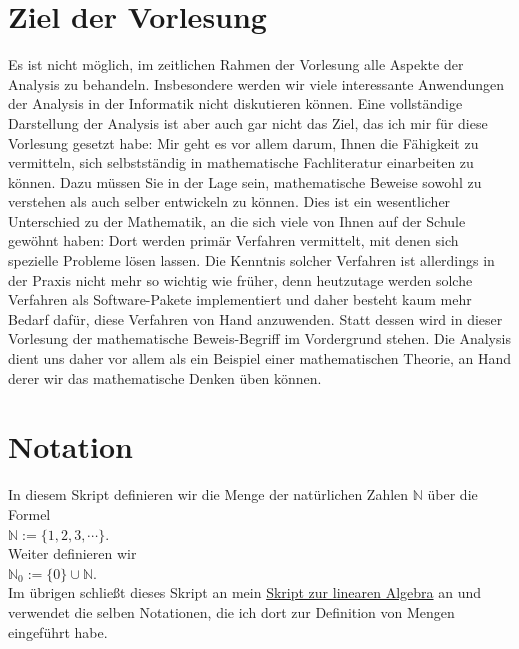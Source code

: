 \section{Ziel der Vorlesung}
Es ist nicht m\"oglich, im zeitlichen Rahmen der Vorlesung alle Aspekte der Analysis zu behandeln.
Insbesondere werden wir viele interessante Anwendungen der Analysis in der Informatik nicht
diskutieren k\"onnen.  Eine vollst\"andige Darstellung der Analysis ist aber auch gar nicht das Ziel,
das ich mir f\"ur diese Vorlesung gesetzt habe:  Mir geht es vor allem  darum, Ihnen die F\"ahigkeit zu
vermitteln, sich selbstst\"andig in mathematische Fachliteratur einarbeiten zu k\"onnen.  Dazu m\"ussen
Sie in der Lage 
sein, mathematische Beweise sowohl zu verstehen als auch selber entwickeln zu k\"onnen.   Dies ist ein
wesentlicher Unterschied zu der Mathematik, an die sich viele von Ihnen auf der Schule gew\"ohnt haben:
Dort werden prim\"ar Verfahren vermittelt, mit denen sich spezielle Probleme l\"osen lassen.  Die Kenntnis
solcher Verfahren ist allerdings in der Praxis nicht mehr so wichtig wie fr\"uher, denn heutzutage
werden solche Verfahren als Software-Pakete implementiert und daher besteht kaum mehr Bedarf daf\"ur,
diese Verfahren von Hand anzuwenden.  Statt dessen wird in
dieser Vorlesung der mathematische Beweis-Begriff im Vordergrund stehen.  Die Analysis dient uns
daher vor allem als ein Beispiel einer mathematischen Theorie, an Hand derer wir das mathematische 
Denken \"uben k\"onnen. 

\section{Notation}
In diesem Skript definieren wir die Menge der nat\"urlichen Zahlen $\mathbb{N}$ \"uber die Formel
\\[0.2cm]
\hspace*{1.3cm}
$\mathbb{N} := \{ 1, 2, 3, \cdots \}$.
\\[0.2cm]
Weiter definieren wir
\\[0.2cm]
\hspace*{1.3cm}
$\mathbb{N}_0 := \{ 0 \} \cup \mathbb{N}$.
\\[0.2cm]
Im \"ubrigen schlie\ss{}t dieses Skript an mein
\href{https://github.com/karlstroetmann/Lineare-Algebra/blob/master/Script/lineare-algebra.pdf}{Skript zur linearen Algebra} 
an und verwendet die selben Notationen, die ich dort zur Definition von Mengen eingef\"uhrt habe.
\pagebreak

